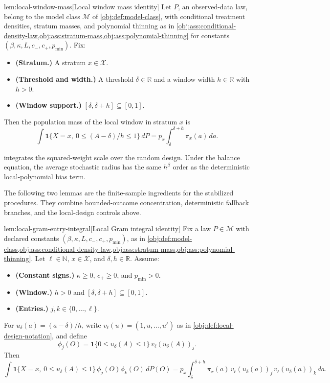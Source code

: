 \begin{lemmav}{lem:local-window-mass}[Local window mass identity]
Let \(P\), an observed-data law, belong to the model class \(\mathcal M\) of \cref{obj:def:model-class}, with conditional treatment densities, stratum masses, and polynomial thinning as in \cref{obj:ass:conditional-density-law,obj:ass:stratum-mass,obj:ass:polynomial-thinning} for constants \((\beta,\kappa,L,c_-,c_+,p_{\min})\).  Fix:
\begin{itemize}
\item \textbf{(Stratum.)} A stratum \(x\in\mathcal X\).
\item \textbf{(Threshold and width.)} A threshold \(\delta\in\mathbb R\) and a window width \(h\in\mathbb R\) with \(h>0\).
\item \textbf{(Window support.)} \([\delta,\delta+h]\subseteq[0,1]\).
\end{itemize}
Then the population mass of the local window in stratum \(x\) is
\[
\int \mathbf 1\{X=x,\ 0\le (A-\delta)/h\le 1\}\,dP
=
p_x\int_{\delta}^{\delta+h}\pi_x(a)\,da.
\]
\end{lemmav}

 integrates the squared-weight scale over the random design. Under the balance equation, the average stochastic radius has the same \(h^\beta\) order as the deterministic local-polynomial bias term.

The following two lemmas are the finite-sample ingredients for the stabilized procedures. They combine bounded-outcome concentration, deterministic fallback branches, and the local-design controls above.

\begin{lemmav}{lem:local-gram-entry-integral}[Local Gram integral identity]
Fix a law \(P\in\mathcal M\) with declared constants \((\beta,\kappa,L,c_-,c_+,p_{\min})\), as in \cref{obj:def:model-class,obj:ass:conditional-density-law,obj:ass:stratum-mass,obj:ass:polynomial-thinning}.  Let \(\ell\in\mathbb N\), \(x\in\mathcal X\), and \(\delta,h\in\mathbb R\).  Assume:
\begin{itemize}
\item \textbf{(Constant signs.)} \(\kappa\ge 0\), \(c_+\ge 0\), and \(p_{\min}>0\).
\item \textbf{(Window.)} \(h>0\) and \([\delta,\delta+h]\subseteq[0,1]\).
\item \textbf{(Entries.)} \(j,k\in\{0,\ldots,\ell\}\).
\end{itemize}
For \(u_\delta(a)=(a-\delta)/h\), write \(v_\ell(u)=(1,u,\ldots,u^\ell)\) as in \cref{obj:def:local-design-notation}, and define
\[
\phi_j(O)=\mathbf 1\{0\le u_\delta(A)\le 1\}\,v_\ell(u_\delta(A))_j .
\]
Then
\[
\int \mathbf 1\{X=x,\ 0\le u_\delta(A)\le 1\}\,\phi_j(O)\phi_k(O)\,dP(O)
=
p_x\int_{\delta}^{\delta+h}
\pi_x(a)\,
v_\ell(u_\delta(a))_j\,
v_\ell(u_\delta(a))_k\,da .
\]
\end{lemmav}

